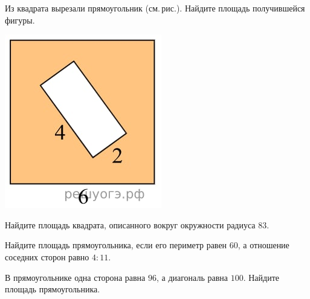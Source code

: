 %	
%
%
\begin{class}[number=7]
	\begin{listofex}
		\item 
	\begin{minipage}[t]{0.57\textwidth}
		Из квадрата вырезали прямоугольник (см. рис.). Найдите площадь получившейся фигуры.
	\end{minipage}
	\begin{minipage}[c]{0.3\textwidth}
		\includegraphics[align=t, width=\textwidth]{pics/G91M4L7-1}
	\end{minipage}
		\item Найдите площадь квадрата, описанного вокруг окружности радиуса \( 83 \).
		\item Найдите площадь прямоугольника, если его периметр равен \( 60 \), а отношение соседних сторон равно \( 4:11 \).
		\item В прямоугольнике одна сторона равна \( 96 \), а диагональ равна \( 100 \). Найдите площадь прямоугольника.
		\item 

\end{listofex}
\end{class}
